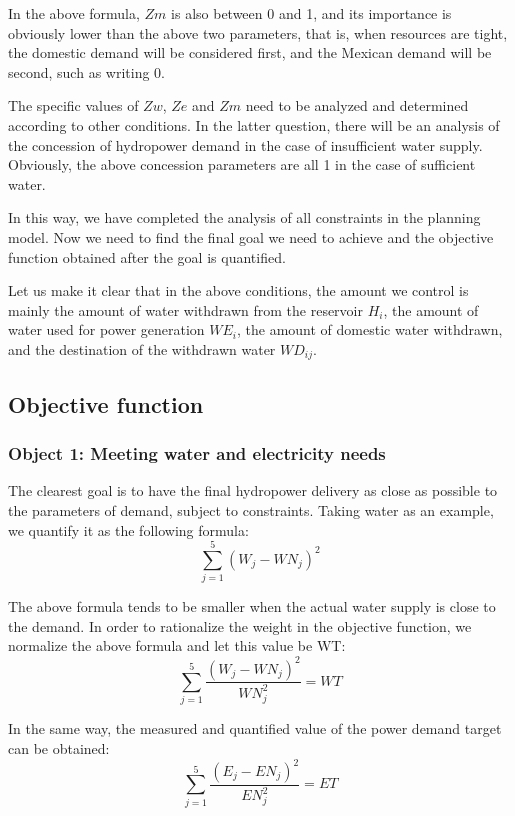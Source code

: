 \documentclass{mcmthesis}
\begin{document}
In the above formula, $Zm$ is also between 0 and 1, and its importance is obviously lower than the above two parameters, that is, when resources are tight, the domestic demand will be considered first, and the Mexican demand will be second, such as writing 0.

The specific values of $Zw$, $Ze$ and $Zm$ need to be analyzed and determined according to other conditions. In the latter question, there will be an analysis of the concession of hydropower demand in the case of insufficient water supply. Obviously, the above concession parameters are all 1 in the case of sufficient water.

In this way, we have completed the analysis of all constraints in the planning model. Now we need to find the final goal we need to achieve and the objective function obtained after the goal is quantified.

Let us make it clear that in the above conditions, the amount we control is mainly the amount of water withdrawn from the reservoir $H_i$, the amount of water used for power generation $WE_i$, the amount of domestic water withdrawn, and the destination of the withdrawn water $WD_{ij}$.


\subsection{Objective function}
\subsubsection{Object 1: Meeting water and electricity needs}
The clearest goal is to have the final hydropower delivery as close as possible to the parameters of demand, subject to constraints. Taking water as an example, we quantify it as the following formula:
\begin{equation}
	\sum_{j=1}^{5}(W_j-WN_{j})^2
\end{equation}

The above formula tends to be smaller when the actual water supply is close to the demand. In order to rationalize the weight in the objective function, we normalize the above formula and let this value be WT:
\begin{equation}
	\sum_{j=1}^{5}\frac{(W_j-WN_{j})^2}{WN_{j}^2}=WT
\end{equation}

In the same way, the measured and quantified value of the power demand target can be obtained:
\begin{equation}
	\sum_{j=1}^{5}\frac{(E_j-EN_{j})^2}{EN_{j}^2}=ET
\end{equation}
\end{document}
